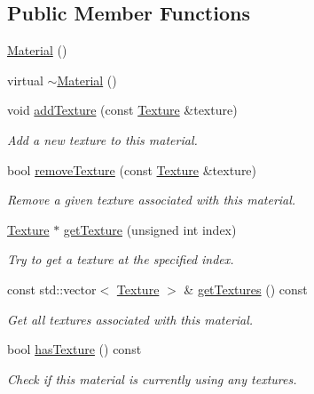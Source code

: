 \subsection*{Public Member Functions}
\begin{DoxyCompactItemize}
\item 
\mbox{\hyperlink{classec_1_1_material_a259d88ca352df2d284380f0b37052652}{Material}} ()
\item 
virtual \mbox{\hyperlink{classec_1_1_material_aec5bd3f3ef761f49a5028b415a9de52e}{$\sim$\+Material}} ()
\item 
void \mbox{\hyperlink{classec_1_1_material_aad92ada3fcc1f7b66e6bf3b6aeac73b8}{add\+Texture}} (const \mbox{\hyperlink{classec_1_1_texture}{Texture}} \&texture)
\begin{DoxyCompactList}\small\item\em Add a new texture to this material. \end{DoxyCompactList}\item 
bool \mbox{\hyperlink{classec_1_1_material_aa22a00f6a91e7f0daff6885e4e0944d3}{remove\+Texture}} (const \mbox{\hyperlink{classec_1_1_texture}{Texture}} \&texture)
\begin{DoxyCompactList}\small\item\em Remove a given texture associated with this material. \end{DoxyCompactList}\item 
\mbox{\hyperlink{classec_1_1_texture}{Texture}} $\ast$ \mbox{\hyperlink{classec_1_1_material_a8679615f24284e809f213b882bec81bf}{get\+Texture}} (unsigned int index)
\begin{DoxyCompactList}\small\item\em Try to get a texture at the specified index. \end{DoxyCompactList}\item 
const std\+::vector$<$ \mbox{\hyperlink{classec_1_1_texture}{Texture}} $>$ \& \mbox{\hyperlink{classec_1_1_material_a95d74f12ec9d69a764a249e36b6b857c}{get\+Textures}} () const
\begin{DoxyCompactList}\small\item\em Get all textures associated with this material. \end{DoxyCompactList}\item 
bool \mbox{\hyperlink{classec_1_1_material_a961612ff2caee16d5d4b8f9b74042cf2}{has\+Texture}} () const
\begin{DoxyCompactList}\small\item\em Check if this material is currently using any textures. \end{DoxyCompactList}\item 

\end{DoxyCompactItemize}
